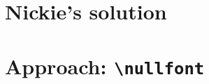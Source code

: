 \documentclass[11pt]{article}
\begin{document}
\section{Nickie's solution}


\section{Approach: \texttt{\textbackslash{}nullfont}}

\end{document}
